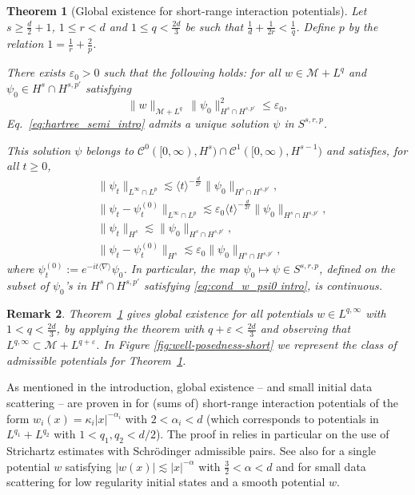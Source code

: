 \documentclass[12pt]{article}
\theoremstyle{plain}
\newtheorem{theo}{Theorem}[section]
\newtheorem{rem}[theo]{Remark}
\newcommand{\meas}{\mathcal{M}}
\begin{document}
	\begin{theo}[Global existence for short-range interaction potentials]
		\label{th:global-short-range-intro}
	Let $s\ge\frac{d}{2} +1$, $1\le r <d$ and $1\le q<\frac{2d}{3}$ be such that $\frac{1}{d}+\frac{1}{2r}<\frac{1}{q}$. Define $p$ by the relation $1=\frac{1}{r}+\frac{2}{p}$.

There exists $\varepsilon_0>0$ such that the following holds: for all $w\in\meas+L^{q}$ and~$\psi_{0}\in H^{s}\cap H^{s,p'}$ satisfying
\begin{equation}\label{eq:cond_w_psi0 intro}
\|w\|_{\meas+L^{q}}\,\|\psi_{0}\|_{H^{s}\cap H^{s,p'}}^{2}\le\varepsilon_0,
\end{equation}
Eq.~\eqref{eq:hartree_semi_intro} admits a unique solution $\psi$ in $S^{s,r,p}$.
 
 This solution $\psi$ belongs to $\mathcal{C}^0([0,\infty),H^{s})\cap \mathcal{C}^1([0,\infty),H^{s-1})$ and satisfies, for all $t\ge0$,
\begin{align}
&\|\psi_t\|_{L^\infty\cap L^{p}} \lesssim \langle t\rangle^{-\frac{d}{2r}}\|\psi_0\|_{H^{s}\cap H^{s,p'}},\label{eq:estim1_psit}\\
&\big\|\psi_t-\psi^{(0)}_t\big\|_{L^\infty\cap L^{p}} \lesssim \varepsilon_0\langle t\rangle^{-\frac{d}{2r}}\|\psi_0\|_{H^{s}\cap H^{s,p'}},\\
&\|\psi_t\|_{H^s} \lesssim \|\psi_0\|_{H^{s}\cap H^{s,p'}}, \label{eq:estim_psit_energy}\\
&\big\|\psi_t-\psi^{(0)}_t\big\|_{H^s} \lesssim \varepsilon_0 \|\psi_0\|_{H^{s}\cap H^{s,p'}},\label{eq:estim4_psit}
\end{align}
where $\psi^{(0)}_t:=e^{-it\langle\nabla\rangle}\psi_0$. In particular, the map $\psi_0\mapsto \psi\in S^{s,r,p}$, defined on the subset of $\psi_0$'s in $H^s\cap H^{s,p'}$ satisfying \eqref{eq:cond_w_psi0 intro},
is continuous.
	\end{theo}

\begin{rem}
	Theorem~\ref{th:global-short-range-intro} gives global existence for all potentials $w \in L^{q,\infty}$ with $1< q<\frac{2d}{3}$, by applying the theorem with $q+\varepsilon<\frac{2d}{3}$ and observing that $L^{q,\infty}\subset \meas + L^{q+\varepsilon} $. In Figure \ref{fig:well-posedness-short} we represent the class of admissible potentials for Theorem~\ref{th:global-short-range-intro}. 
\end{rem}

As mentioned in the introduction, global existence -- and small initial data scattering -- are proven in \cite{ChoOzawa2} for (sums of) short-range interaction potentials of the form $w_i(x)=\kappa_i|x|^{-\alpha_i}$ with $2<\alpha_i<d$ (which corresponds to potentials in $L^{q_1}+L^{q_2}$ with $1< q_1,q_2<d/2$). The proof in \cite{ChoOzawa2} relies in particular on the use of Strichartz estimates with Schrödinger admissible pairs. See also \cite{NakamuraTsutaya} for a single potential $w$ satisfying $|w(x)|\lesssim|x|^{-\alpha}$ with $\frac32<\alpha<d$ and \cite{Yang} for small data scattering for low regularity initial states and a smooth potential $w$.
\end{document}
